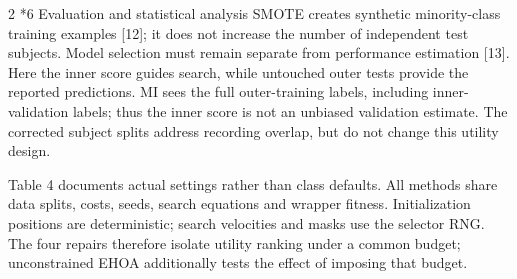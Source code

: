 \documentclass[10pt,a4paper]{article}
\makeatletter
\renewcommand{\section}{\@startsection{section}{1}{0pt}{5pt}{2pt}{\normalfont\normalsize\bfseries}}
\newcommand{\sect}[1]{\section*{#1}}
\makeatother
\begin{document}
\begin{multicols}{2}
\sect{6  Evaluation and statistical analysis}
SMOTE creates synthetic minority-class training examples [12]; it does not increase the number of independent test subjects. Model selection must remain separate from performance estimation [13]. Here the inner score guides search, while untouched outer tests provide the reported predictions. MI sees the full outer-training labels, including inner-validation labels; thus the inner score is not an unbiased validation estimate. The corrected subject splits address recording overlap, but do not change this utility design.

Table 4 documents actual settings rather than class defaults. All methods share data splits, costs, seeds, search equations and wrapper fitness. Initialization positions are deterministic; search velocities and masks use the selector RNG. The four repairs therefore isolate utility ranking under a common budget; unconstrained EHOA additionally tests the effect of imposing that budget.


\end{multicols}
\end{document}
